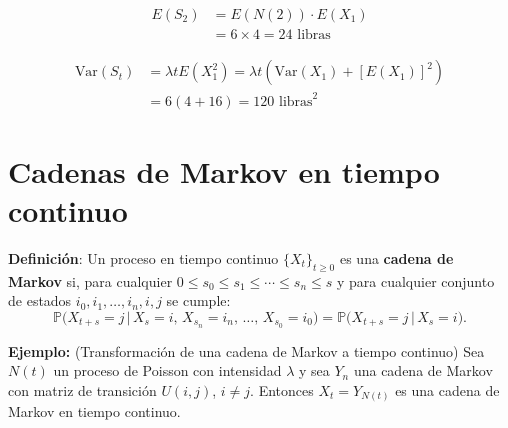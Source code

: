 \documentclass[12pt,a4paper]{article}
\newcommand{\definicion}[1]{%
\begin{definicionbox}
\textbf{Definición}: #1
\end{definicionbox}
}
\begin{document}
\begin{align*}
E(S_2) &= E(N(2)) \cdot E(X_1) \\
&= 6 \times 4 = 24 \text{ libras}
\end{align*}

\begin{align*}
\text{Var}(S_t) &= \lambda t E(X_1^2) = \lambda t \left(\text{Var}(X_1) + [E(X_1)]^2\right) \\
&= 6(4 + 16) = 120 \text{ libras}^2
\end{align*}

\section{Cadenas de Markov en tiempo continuo}

\definicion{Un proceso en tiempo continuo $\{X_t\}_{t \geq 0}$ es una \textbf{cadena de Markov} si, 
para cualquier $0 \leq s_0 \leq s_1 \leq \cdots \leq s_n \leq s$ y para cualquier conjunto de estados $i_0, i_1, \dots, i_n, i, j$ se cumple:
\begin{equation*}
\mathbb{P}\bigl(X_{t+s} = j \,\big|\, X_s = i,\, X_{s_n} = i_n,\, \dots,\, X_{s_0} = i_0 \bigr)
= 
\mathbb{P}\bigl(X_{t+s} = j \,\big|\, X_s = i \bigr).
\end{equation*}}

\textbf{Ejemplo:} (Transformación de una cadena de Markov a tiempo continuo) Sea $N(t)$ un proceso de Poisson con intensidad $\lambda$ y sea $Y_n$ una cadena de Markov con matriz de transición $U(i,j)$, $i \neq j$. Entonces $X_t = Y_{N(t)}$ es una cadena de Markov en tiempo continuo.

\begin{center}
\end{center}
\end{document}
